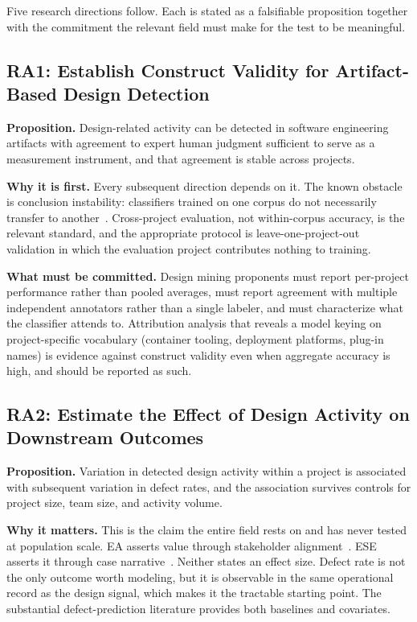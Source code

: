 \documentclass{csimq}
\begin{document}
Five research directions follow. Each is stated as a falsifiable proposition
together with the commitment the relevant field must make for the test to be
meaningful.

\subsection{RA1: Establish Construct Validity for Artifact-Based Design Detection}

\textbf{Proposition.} Design-related activity can be detected in software
engineering artifacts with agreement to expert human judgment sufficient to
serve as a measurement instrument, and that agreement is stable across projects.

\textbf{Why it is first.} Every subsequent direction depends on it. The known
obstacle is conclusion instability: classifiers trained on one corpus do not
necessarily transfer to another~\cite{mahadi2021}. Cross-project evaluation, not
within-corpus accuracy, is the relevant standard, and the appropriate protocol
is leave-one-project-out validation in which the evaluation project contributes
nothing to training.

\textbf{What must be committed.} Design mining proponents must report per-project
performance rather than pooled averages, must report agreement with multiple
independent annotators rather than a single labeler, and must characterize what
the classifier attends to. Attribution analysis that reveals a model keying on
project-specific vocabulary (container tooling, deployment platforms, plug-in
names) is evidence against construct validity even when aggregate
accuracy is high, and should be reported as such.

\subsection{RA2: Estimate the Effect of Design Activity on Downstream Outcomes}

\textbf{Proposition.} Variation in detected design activity within a project is
associated with subsequent variation in defect rates, and the association
survives controls for project size, team size, and activity volume.

\textbf{Why it matters.} This is the claim the entire field rests on and has
never tested at population scale. EA asserts value through stakeholder
alignment~\cite{gong2019}. ESE asserts it through case
narrative~\cite{kotze2016}. Neither states an effect size. Defect rate is not
the only outcome worth modeling, but it is observable in the same operational
record as the design signal, which makes it the tractable starting point. The
substantial defect-prediction literature provides both baselines and covariates.
\end{document}

